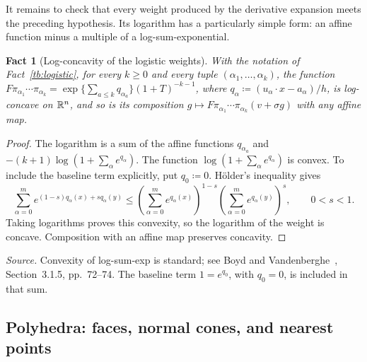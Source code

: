 \documentclass[11pt,letterpaper]{article}
\theoremstyle{plain}
\newtheorem{fact}{Fact}[section]
\begin{document}
It remains to check that every weight produced by the derivative
expansion meets the preceding hypothesis. Its logarithm has a particularly
simple form: an affine function minus a multiple of a log-sum-exponential.

\begin{fact}[Log-concavity of the logistic weights]\label{tb:lc-weights}
With the notation of Fact~\ref{tb:logistic}, for every \(k\ge0\) and every
tuple \((\alpha_1,\ldots,\alpha_k)\), the function
\(F\pi_{\alpha_1}\cdots\pi_{\alpha_k}=\exp\{\sum_{a\le k}q_{\alpha_a}\}
(1+T)^{-k-1}\), where \(q_\alpha\coloneqq (u_\alpha\cdot x-a_\alpha)/h\), is
log-concave on \(\mathbb R^n\), and so is its composition
\(g\mapsto F\pi_{\alpha_1}\cdots\pi_{\alpha_k}(v+\sigma g)\) with any affine map.
\end{fact}

\begin{proof}
The logarithm is a sum of the affine functions \(q_{\alpha_a}\) and
\(-(k+1)\log(1+\sum_\alpha e^{q_\alpha})\). The function
\(\log(1+\sum_\alpha e^{q_\alpha})\) is convex. To include the baseline
term explicitly, put \(q_0\coloneqq0\). H\"older's inequality gives
\[
 \sum_{\alpha=0}^m e^{(1-s)q_\alpha(x)+s q_\alpha(y)}
 \le\left(\sum_{\alpha=0}^m e^{q_\alpha(x)}\right)^{1-s}
     \left(\sum_{\alpha=0}^m e^{q_\alpha(y)}\right)^s,
 \qquad 0<s<1.
\]
Taking logarithms proves this convexity, so the logarithm of the weight
is concave. Composition with an affine map preserves concavity.
\end{proof}

\emph{Source.} Convexity of log-sum-exp is standard; see
Boyd and Vandenberghe~, Section~3.1.5, pp.~72--74.
The baseline term \(1=e^{q_0}\), with \(q_0=0\), is included in that sum.

\subsection{Polyhedra: faces, normal cones, and nearest points}\label{tb:sec:poly}
\end{document}
